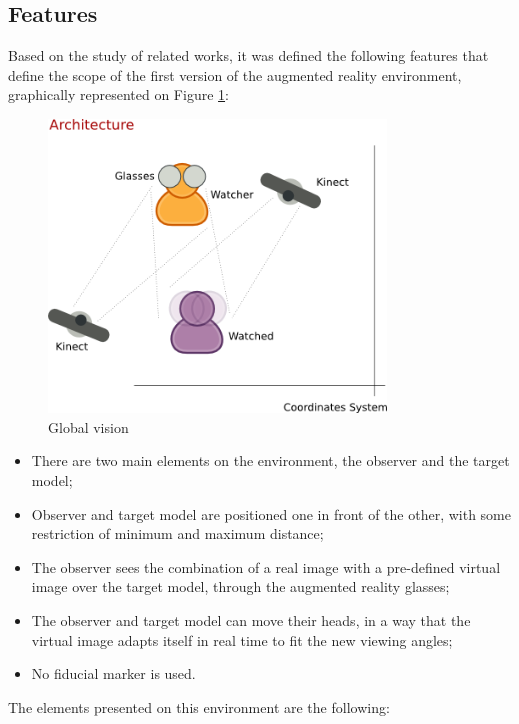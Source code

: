 \documentclass[msc, a4paper, classic, en]{ufbathesis}
\begin{document}
\subsection{Features}

Based on the study of related works, it was defined the following features that define the scope of the first version of the augmented
reality environment, graphically represented on Figure \ref{fig:diagram}:

\begin{figure}
\label{fig:diagram}
\centering
\includegraphics[width=0.8\textwidth]{images/diagram.png}
\caption{Global vision}
\end{figure}

\begin{itemize}
  \item There are two main elements on the environment, the observer and the target model;
  \item Observer and target model are positioned one in front of the other, with some restriction of minimum and maximum distance;
  \item The observer sees the combination of a real image with a pre-defined virtual image over the target model, through the augmented
        reality glasses;
  \item The observer and target model can move their heads, in a way that the virtual image adapts itself in real time to fit the new
        viewing angles;
  \item No fiducial marker is used.
\end{itemize}

The elements presented on this environment are the following:
\end{document}
